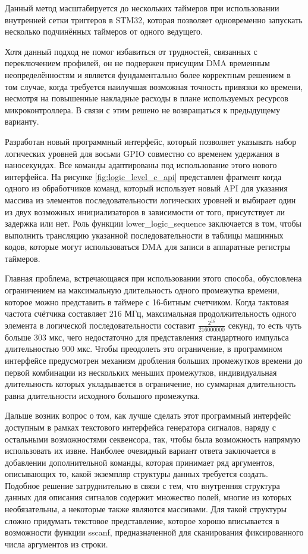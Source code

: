 \documentclass{report}
\begin{document}
Данный метод масштабируется до нескольких таймеров при использовании внутренней сетки триггеров в STM32, которая позволяет одновременно запускать несколько подчинённых таймеров от одного ведущего.

Хотя данный подход не помог избавиться от трудностей, связанных с переключением профилей, он не подвержен присущим DMA временным неопределённостям и является фундаментально более корректным решением в том случае, когда требуется наилучшая возможная точность привязки ко времени, несмотря на повышенные накладные расходы в плане используемых ресурсов микроконтроллера. В связи с этим решено не возвращаться к предыдущему варианту.

Разработан новый программный интерфейс, который позволяет указывать набор логических уровней для восьми GPIO совместно со временем удержания в наносекундах. Все команды адаптированы под использование этого нового интерфейса. На рисунке \ref{fig:logic_level_c_api} представлен фрагмент когда одного из обработчиков команд, который использует новый API для указания массива из элементов последовательности логических уровней и выбирает один из двух возможных инициализаторов в зависимости от того, присутствует ли задержка или нет. Роль функции lower\_logic\_sequence заключается в том, чтобы выполнить трансляцию указанной последовательности в таблицы машинных кодов, которые могут использоваться DMA для записи в аппаратные регистры таймеров.


Главная проблема, встречающаяся при использовании этого способа, обусловлена ограничением на максимальную длительность одного промежутка времени, которое можно представить в таймере с 16-битным счетчиком. Когда тактовая частота счётчика составляет 216 МГц, максимальная продолжительность одного элемента в логической последовательности составит $\frac{2^{16}}{216000000}$ секунд, то есть чуть больше 303 мкс, чего недостаточно для представления стандартного импульса длительностью 900 мкс. Чтобы преодолеть это ограничение, в программном интерфейсе предусмотрен механизм дробления больших промежутков времени до первой комбинации из нескольких меньших промежутков, индивидуальная длительность которых укладывается в ограничение, но суммарная длительность равна длительности исходного большого промежутка.

Дальше возник вопрос о том, как лучше сделать этот программный интерфейс доступным в рамках текстового интерфейса генератора сигналов, наряду с остальными возможностями секвенсора, так, чтобы была возможность напрямую использовать их извне. Наиболее очевидный вариант ответа заключается в добавлении дополнительной команды, которая принимает ряд аргументов, описывающих то, какой экземпляр структуры данных требуется создать. Подобное решение затруднительно в связи с тем, что внутренняя структура данных для описания сигналов содержит множество полей, многие из которых необязательны, а некоторые также являются массивами. Для такой структуры сложно придумать текстовое представление, которое хорошо вписывается в возможности функции sscanf, предназначенной для сканирования фиксированного числа аргументов из строки.
\end{document}
